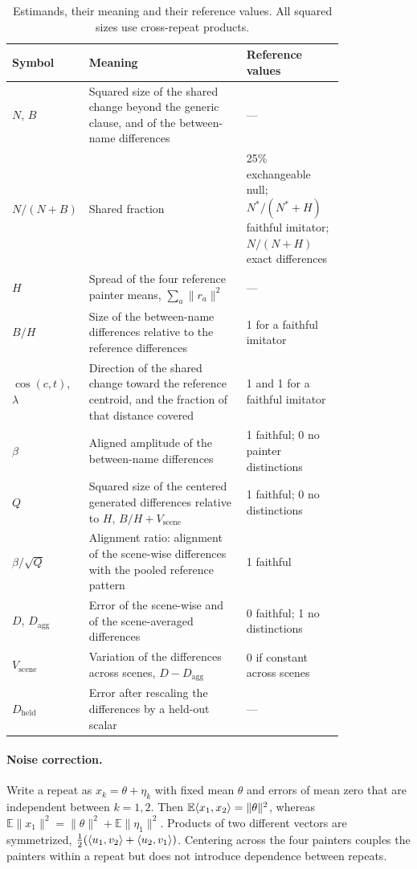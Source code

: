 \begin{table}[ht]
\caption{Estimands, their meaning and their reference values. All squared sizes use
cross-repeat products.}
\label{tab:estimands}
\vspace{2pt}
\centering\small
\begin{tabular}{@{}lp{0.52\linewidth}p{0.3\linewidth}@{}}
\toprule
Symbol & Meaning & Reference values\\
\midrule
$N$, $B$ & Squared size of the shared change beyond the generic clause, and of the
between-name differences & ---\\
$N/(N+B)$ & Shared fraction & 25\% exchangeable null; $N^*/(N^*+H)$ faithful imitator;
$N/(N+H)$ exact differences\\
$H$ & Spread of the four reference painter means, $\sum_a\|r_a\|^2$ & ---\\
$B/H$ & Size of the between-name differences relative to the reference differences & 1 for a
faithful imitator\\
$\cos(c,t)$, $\lambda$ & Direction of the shared change toward the reference centroid, and the
fraction of that distance covered & 1 and 1 for a faithful imitator\\
$\beta$ & Aligned amplitude of the between-name differences & 1 faithful; 0 no painter
distinctions\\
$Q$ & Squared size of the centered generated differences relative to $H$,
$B/H+V_{\mathrm{scene}}$ & 1 faithful; 0 no distinctions\\
$\beta/\sqrt{Q}$ & Alignment ratio: alignment of the scene-wise differences with the pooled
reference pattern & 1 faithful\\
$D$, $D_{\mathrm{agg}}$ & Error of the scene-wise and of the scene-averaged differences & 0
faithful; 1 no distinctions\\
$V_{\mathrm{scene}}$ & Variation of the differences across scenes, $D-D_{\mathrm{agg}}$ & 0 if
constant across scenes\\
$D_{\mathrm{held}}$ & Error after rescaling the differences by a held-out scalar & ---\\
\bottomrule
\end{tabular}
\end{table}

\paragraph{Noise correction.} Write a repeat as $x_k=\theta+\eta_k$ with fixed mean $\theta$
and errors of mean zero that are independent between $k=1,2$. Then
$\mathbb E\langle x_1,x_2\rangle=\|\theta\|^2$, whereas $\mathbb E\|x_1\|^2=\|\theta\|^2+\mathbb
E\|\eta_1\|^2$. Products of two different vectors are symmetrized,
$\frac12(\langle u_1,v_2\rangle+\langle u_2,v_1\rangle)$. Centering across the four painters couples the painters
within a repeat but does not introduce dependence between repeats.

